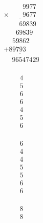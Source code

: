\begin{minipage}[t]{0.05\linewidth}
\begin{align*}\begin{array}{c}
\textvisiblespace
\\
\textvisiblespace
\end{array}\end{align*}
\end{minipage}
\begin{minipage}[t]{0.3\linewidth}
\begin{align*}\begin{array}{c}
\phantom{
\times0000
}
9977\\
\underline{
\times
\phantom{
0000
}
9677
}\\
\phantom{
+000
}
69839
\\
\phantom{
+00
}
69839
\phantom0\\
\phantom{
+0
}
59862
\phantom0\phantom0\\
\underline{
+
89793
\phantom0\phantom0\phantom0
}
\\
\phantom{+}
96547429
\end{array}\end{align*}
\end{minipage}
\begin{minipage}[t]{0.05\linewidth}
\begin{align*}\begin{array}{c}
4
\\
5
\\
6
\\
6
\\
4
\\
5
\\
6
\end{array}\end{align*}
\end{minipage}
\begin{minipage}[t]{0.05\linewidth}
\begin{align*}\begin{array}{c}
6
\\
4
\\
4
\\
5
\\
5
\\
6
\\
6
\end{array}\end{align*}
\end{minipage}
\begin{minipage}[t]{0.05\linewidth}
\begin{align*}\begin{array}{c}
8
\\
8
\end{array}\end{align*}
\end{minipage}

